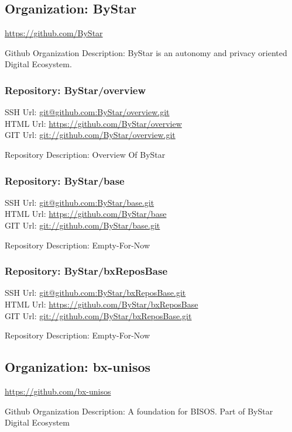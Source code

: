 \subsection{Organization: ByStar}

\url{https://github.com/ByStar}

Github Organization Description: ByStar is an autonomy and privacy oriented Digital Ecosystem.

\subsubsection{Repository: ByStar/overview}

SSH Url:  \url{git@github.com:ByStar/overview.git}\\
HTML Url: \url{https://github.com/ByStar/overview}\\
GIT Url:  \url{git://github.com/ByStar/overview.git}

Repository Description: Overview Of ByStar

\subsubsection{Repository: ByStar/base}

SSH Url:  \url{git@github.com:ByStar/base.git}\\
HTML Url: \url{https://github.com/ByStar/base}\\
GIT Url:  \url{git://github.com/ByStar/base.git}

Repository Description: Empty-For-Now

\subsubsection{Repository: ByStar/bxReposBase}

SSH Url:  \url{git@github.com:ByStar/bxReposBase.git}\\
HTML Url: \url{https://github.com/ByStar/bxReposBase}\\
GIT Url:  \url{git://github.com/ByStar/bxReposBase.git}

Repository Description: Empty-For-Now

\subsection{Organization: bx-unisos}

\url{https://github.com/bx-unisos}

Github Organization Description: A foundation for BISOS. Part of ByStar Digital Ecosystem

